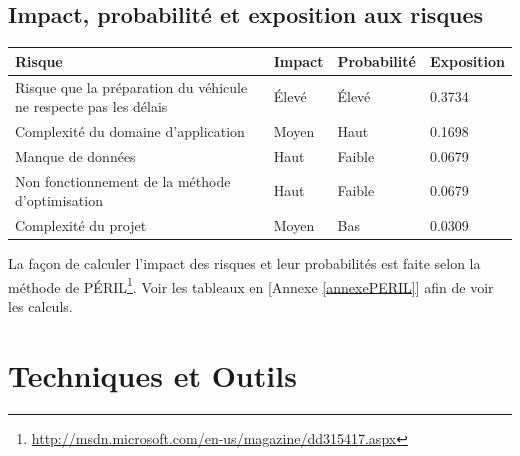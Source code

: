 \documentclass[11pt]{article}
\begin{document}
\subsection{Impact, probabilité et exposition aux risques}
\begin{table}[H]
  \begin{center}
    \begin{tabu} to \linewidth {X[3.5,l]|X[0.7,l]|X[1,l]|X[1,l]}
      \textbf{Risque}          & \textbf{Impact} & \textbf{Probabilité} & \textbf{Exposition} \\ \hline
      Risque que la préparation du véhicule ne respecte pas les délais & Élevé & Élevé & 0.3734 \\ \hline
      Complexité du domaine d'application & Moyen & Haut   & 0.1698            \\ \hline
      Manque de données                   & Haut  & Faible & 0.0679            \\ \hline
      Non fonctionnement de la méthode d'optimisation & Haut & Faible & 0.0679 \\ \hline
      Complexité du projet                & Moyen & Bas    & 0.0309            \\
    \end{tabu}
  \end{center}
\end{table}


La façon de calculer l'impact des risques et leur probabilités est faite selon la méthode de PÉRIL\footnote{\url{http://msdn.microsoft.com/en-us/magazine/dd315417.aspx}}. Voir les tableaux en [Annexe \ref{annexePERIL}] afin de voir les calculs. 

\section{Techniques et Outils}
\end{document}
